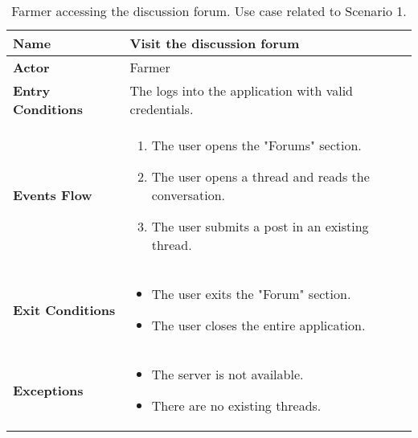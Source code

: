 \begin{table}[hbt!]
\centering
\small
\caption{\label{tab:farmerViewForum}Farmer accessing the discussion forum. Use case related to Scenario 1.}
\renewcommand{\arraystretch}{1.25}
\begin{tabular}{|l|>{\raggedright\arraybackslash}m{12cm}|}

    \hline
    \textbf{Name} & Visit the discussion forum\\
    \hline
   	\textbf{Actor} & Farmer\\
    \hline
    \textbf{Entry Conditions} & The logs into the application with valid credentials.\\
    \hline
    \textbf{Events Flow} & 
    		\begin{enumerate}
    			\item The user opens the "Forums" section.
    			\item The user opens a thread and reads the conversation.
    			\item The user submits a post in an existing thread.
    		\end{enumerate}
    	\\
    \hline
    \textbf{Exit Conditions} & \begin{itemize}
    	\item The user exits the "Forum" section.
    	\item The user closes the entire application.\end{itemize}\\
    \hline
    \textbf{Exceptions} & 
    		\begin{itemize}
    			\item The server is not available.
    			\item There are no existing threads.
    		\end{itemize}
    	\\
    \hline
\end{tabular}
\end{table}